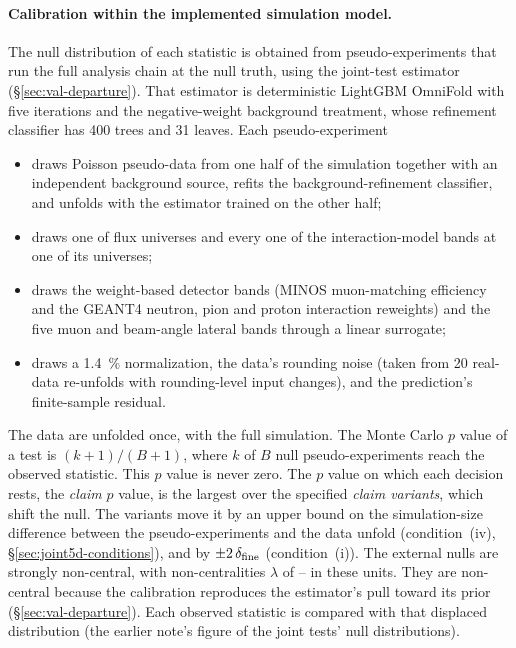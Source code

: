\paragraph{Calibration within the implemented simulation model.} The null distribution of each statistic is obtained from pseudo-experiments that run the full analysis chain at the null truth, using the joint-test estimator (\S\ref{sec:val-departure}). That estimator is deterministic LightGBM OmniFold with five iterations and the negative-weight background treatment, whose refinement classifier has 400 trees and 31 leaves. Each pseudo-experiment
\begin{itemize}[itemsep=1pt, topsep=2pt]
  \item draws Poisson pseudo-data from one half of the simulation together with an independent background source, refits the background-refinement classifier, and unfolds with the estimator trained on the other half;
  \item draws one of \jtFluxUniverses{} flux universes and every one of the \jtModelBands{} interaction-model bands at one of its universes;
  \item draws the weight-based detector bands (MINOS muon-matching efficiency and the GEANT4 neutron, pion and proton interaction reweights) and the five muon and beam-angle lateral bands through a linear surrogate;
  \item draws a \SI{1.4}{\percent} normalization, the data's rounding noise (taken from 20 real-data re-unfolds with rounding-level input changes), and the prediction's finite-sample residual.
\end{itemize}
The data are unfolded once, with the full simulation. The Monte Carlo $p$ value of a test is $(k+1)/(B+1)$, where $k$ of $B$ null pseudo-experiments reach the observed statistic. This $p$ value is never zero. The $p$ value on which each decision rests, the \emph{claim} $p$ value, is the largest over the specified \emph{claim variants}, which shift the null. The variants move it by an upper bound on the simulation-size difference between the pseudo-experiments and the data unfold (condition~(iv), \S\ref{sec:joint5d-conditions}), and by $\pm2\,\delta_{\mathrm{fine}}$ (condition~(i)). The external nulls are strongly non-central, with non-centralities $\lambda$ of \jtLambdaMin{}--\jtLambdaMax{} in these units. They are non-central because the calibration reproduces the estimator's pull toward its prior (\S\ref{sec:val-departure}). Each observed statistic is compared with that displaced distribution (the earlier note's figure of the joint tests' null distributions).

